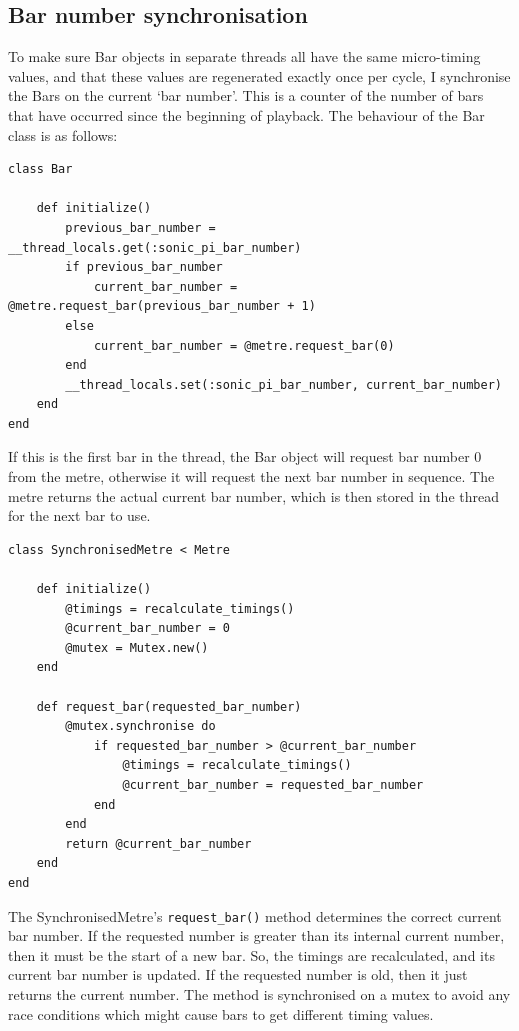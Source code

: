 \documentclass[12pt,twoside,openright]{report}
\begin{document}
\subsection{Bar number synchronisation} \label{bar_number_synchronisation}

To make sure Bar objects in separate threads all have the same micro-timing
values, and that these values are regenerated exactly once per cycle, I
synchronise the Bars on the current `bar number'. This is a counter of the
number of bars that have occurred since the beginning of playback. The behaviour
of the Bar class is as follows:

\begin{verbatim}
class Bar

    def initialize()
        previous_bar_number = __thread_locals.get(:sonic_pi_bar_number)
        if previous_bar_number
            current_bar_number = @metre.request_bar(previous_bar_number + 1)
        else
            current_bar_number = @metre.request_bar(0)
        end
        __thread_locals.set(:sonic_pi_bar_number, current_bar_number)
    end
end
\end{verbatim}

If this is the first bar in the thread, the Bar object will request bar number 0
from the metre, otherwise it will request the next bar number in sequence. The
metre returns the actual current bar number, which is then stored in the thread
for the next bar to use.

\begin{verbatim}
class SynchronisedMetre < Metre

    def initialize()
        @timings = recalculate_timings()
        @current_bar_number = 0
        @mutex = Mutex.new()
    end

    def request_bar(requested_bar_number)
        @mutex.synchronise do
            if requested_bar_number > @current_bar_number
                @timings = recalculate_timings()
                @current_bar_number = requested_bar_number
            end
        end
        return @current_bar_number
    end
end
\end{verbatim}

The SynchronisedMetre's \verb'request_bar()' method determines the correct current bar
number. If the requested number is greater than its internal current number,
then it must be the start of a new bar. So, the timings are recalculated, and
its current bar number is updated. If the requested number is old, then it just
returns the current number. The method is synchronised on a mutex to avoid any
race conditions which might cause bars to get different timing values.
\end{document}

